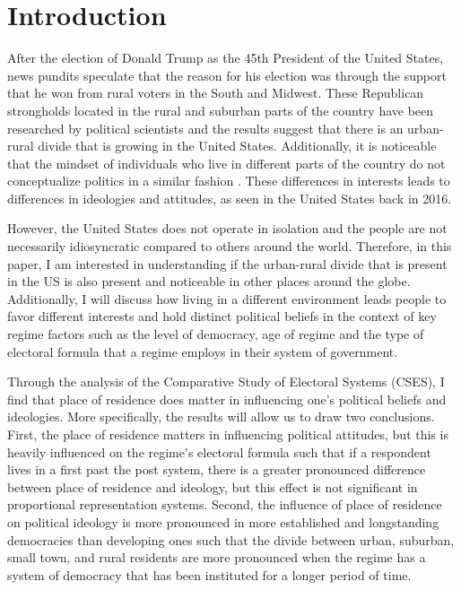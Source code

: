 \documentclass[12pt, titlepage]{article}
\begin{document}
\listoftables
\clearpage

\listoffigures
\clearpage

\section{Introduction}

After the election of Donald Trump as the 45th President of the United States, news pundits speculate that the reason for his election was through the support that he won from rural voters in the South and Midwest. These Republican strongholds located in the rural and suburban parts of the country have been researched by political scientists \citep{walsh_putting_2012} and the results suggest that there is an urban-rural divide that is growing in the United States. Additionally, it is noticeable that the mindset of individuals who live in different parts of the country do not conceptualize politics in a similar fashion \citep{holloway_burning_2007}. These differences in interests leads to differences in ideologies and attitudes, as seen in the United States back in 2016.

However, the United States does not operate in isolation and the people are not necessarily idiosyncratic compared to others around the world. Therefore, in this paper, I am interested in understanding if the urban-rural divide that is present in the US is also present and noticeable in other places around the globe. Additionally, I  will discuss how living in a different environment leads people to favor different interests and hold distinct political beliefs in the context of key regime factors such as the level of democracy, age of regime and the type of electoral formula that a regime employs in their system of government.
 
Through the analysis of the Comparative Study of Electoral Systems (CSES), I find that place of residence does matter in influencing one's political beliefs and ideologies. More specifically, the results will allow us to draw two conclusions. First, the place of residence matters in influencing political attitudes, but this is heavily influenced on the regime's electoral formula such that if a respondent lives in a first past the post system, there is a greater pronounced difference between place of residence and ideology, but this effect is not significant in proportional representation systems. Second, the influence of place of residence on political ideology is more pronounced in more established and longstanding democracies than developing ones such that the divide between urban, suburban, small town, and rural residents are more pronounced when the regime has a system of democracy that has been instituted for a longer period of time.
 
\end{document}
